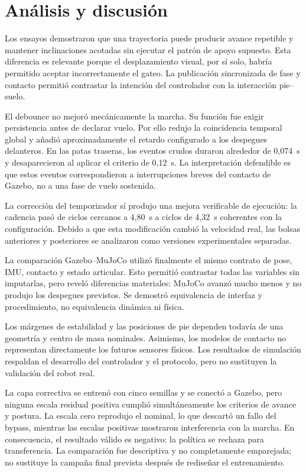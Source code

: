 \chapter{Análisis y discusión}

Los ensayos demostraron que una trayectoria puede producir avance repetible y
mantener inclinaciones acotadas sin ejecutar el patrón de apoyo supuesto. Esta
diferencia es relevante porque el desplazamiento visual, por sí solo, habría
permitido aceptar incorrectamente el gateo. La publicación sincronizada de
fase y contacto permitió contrastar la intención del controlador con la
interacción pie--suelo.

El debounce no mejoró mecánicamente la marcha. Su función fue exigir
persistencia antes de declarar vuelo. Por ello redujo la coincidencia temporal
global y añadió aproximadamente el retardo configurado a los despegues
delanteros. En las patas traseras, los eventos crudos duraron alrededor de
0,074~s y desaparecieron al aplicar el criterio de 0,12~s. La interpretación
defendible es que estos eventos correspondieron a interrupciones breves del
contacto de Gazebo, no a una fase de vuelo sostenida.

La corrección del temporizador sí produjo una mejora verificable de ejecución:
la cadencia pasó de ciclos cercanos a 4,80~s a ciclos de 4,32~s coherentes con
la configuración. Debido a que esta modificación cambió la velocidad real, las
bolsas anteriores y posteriores se analizaron como versiones experimentales
separadas.

La comparación Gazebo--MuJoCo utilizó finalmente el mismo contrato de pose,
IMU, contacto y estado articular. Esto permitió contrastar todas las variables
sin imputarlas, pero reveló diferencias materiales: MuJoCo avanzó mucho menos y
no produjo los despegues previstos. Se demostró equivalencia de interfaz y
procedimiento, no equivalencia dinámica ni física.

Los márgenes de estabilidad y las posiciones de pie dependen todavía de una
geometría y centro de masa nominales. Asimismo, los modelos de contacto no
representan directamente los futuros sensores físicos. Los resultados de
simulación respaldan el desarrollo del controlador y el protocolo, pero no
sustituyen la validación del robot real.

La capa correctiva se entrenó con cinco semillas y se conectó a Gazebo, pero
ninguna escala residual positiva cumplió simultáneamente los criterios de
avance y postura. La escala cero reprodujo el nominal, lo que descartó un fallo
del bypass, mientras las escalas positivas mostraron interferencia con la
marcha. En consecuencia, el resultado válido es negativo: la política se
rechaza para transferencia. La comparación fue descriptiva y no completamente
emparejada; no sustituye la campaña final prevista después de rediseñar el
entrenamiento.

